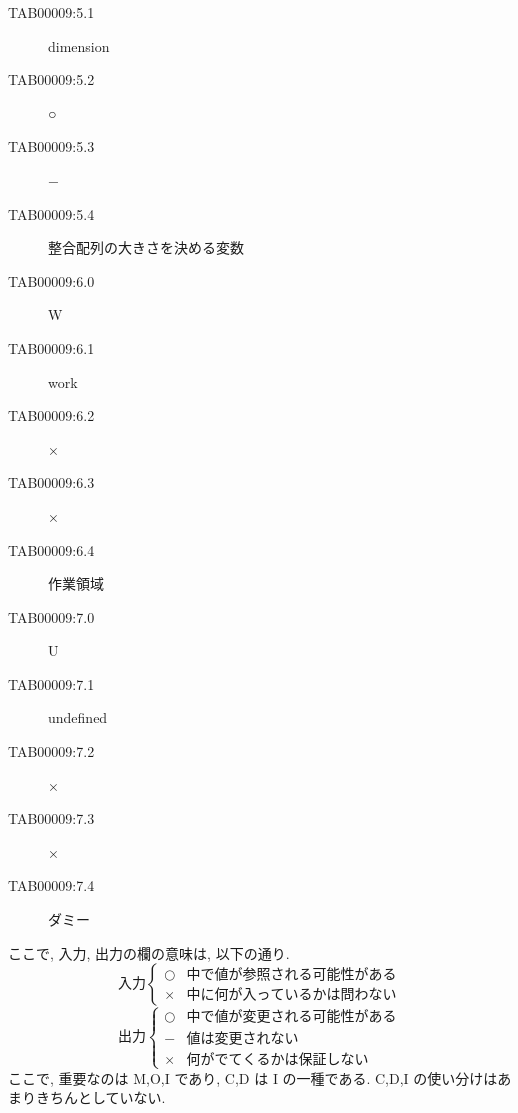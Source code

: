 \begin{enumerate}
\begin{center}
\begin{description}
\item[TAB00009:5.1] dimension
\item[TAB00009:5.2] ○
\item[TAB00009:5.3] −
\item[TAB00009:5.4] 整合配列の大きさを決める変数
\item[TAB00009:6.0] W
\item[TAB00009:6.1] work
\item[TAB00009:6.2] ×
\item[TAB00009:6.3] ×
\item[TAB00009:6.4] 作業領域
\item[TAB00009:7.0] U
\item[TAB00009:7.1] undefined
\item[TAB00009:7.2] ×
\item[TAB00009:7.3] ×
\item[TAB00009:7.4] ダミー
\end{description}

ここで, 入力, 出力の欄の意味は, 以下の通り.
\[
    入力 \left\{
    \begin{array}{ll}   
      ○ &  中で値が参照される可能性がある \\
      × &  中に何が入っているかは問わない
    \end{array}  
     \right.
\]
\[
    出力 \left\{
    \begin{array}{ll}   
      ○ &  中で値が変更される可能性がある \\
      − &  値は変更されない \\
      × &  何がでてくるかは保証しない
    \end{array}  
     \right.
\]
ここで, 重要なのは M,O,I であり, C,D は I の一種である.
C,D,I の使い分けはあまりきちんとしていない.
\end{center}



\end{enumerate}
